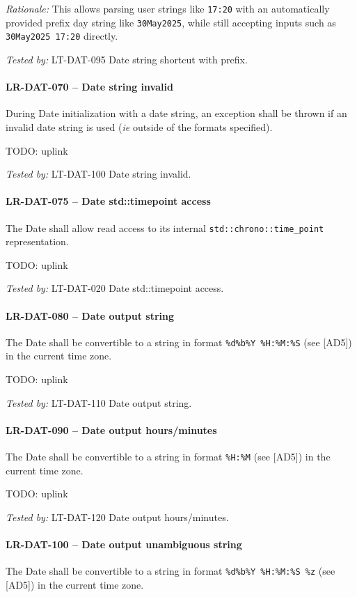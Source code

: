 \textit{Rationale:} This allows parsing user strings like \lstinline{17:20}
with an automatically provided prefix day string like \lstinline{30May2025},
while still accepting inputs such as \lstinline{30May2025 17:20} directly.

\textit{Tested by: } LT-DAT-095 Date string shortcut with prefix.

\paragraph{LR-DAT-070 -- Date string invalid}
During Date initialization with a date string, an exception shall be
thrown if an invalid date string is used (\textit{ie} outside of the formats
specified).

TODO: uplink

\textit{Tested by: } LT-DAT-100 Date string invalid.

\paragraph{LR-DAT-075 -- Date std::time\textunderscore point access}
The Date shall allow read access to its internal
\lstinline{std::chrono::time_point} representation.

TODO: uplink

\textit{Tested by: } LT-DAT-020 Date std::time\textunderscore point access.

\paragraph{LR-DAT-080 -- Date output string}
The Date shall be convertible to a string in format
\lstinline{%d%b%Y %H:%M:%S} (see [AD5]) in the current time zone.

TODO: uplink

\textit{Tested by: } LT-DAT-110 Date output string.

\paragraph{LR-DAT-090 -- Date output hours/minutes}
The Date shall be convertible to a string in format
\lstinline{%H:%M} (see [AD5]) in the current time zone.

TODO: uplink

\textit{Tested by: } LT-DAT-120 Date output hours/minutes.

\paragraph{LR-DAT-100 -- Date output unambiguous string}
The Date shall be convertible to a string in format
\lstinline{%d%b%Y %H:%M:%S %z} (see [AD5]) in the current time zone.

